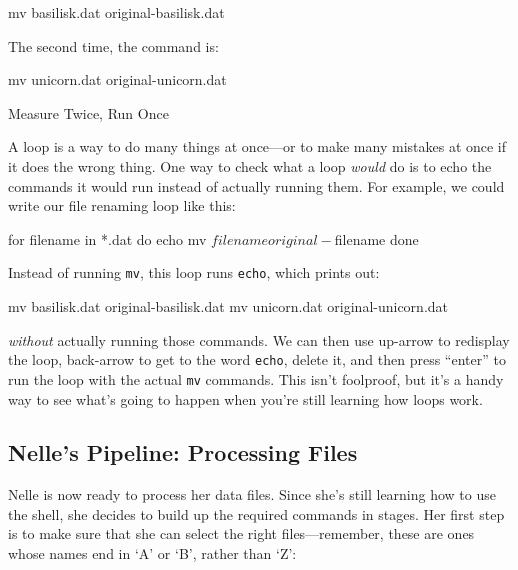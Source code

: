 \begin{VerbIn}
mv basilisk.dat original-basilisk.dat
\end{VerbIn}

The second time, the command is:

\begin{VerbIn}
mv unicorn.dat original-unicorn.dat
\end{VerbIn}

\begin{swcbox}{Measure Twice, Run Once}

A loop is a way to do many things at once---or to make many mistakes at
once if it does the wrong thing. One way to check what a loop
\emph{would} do is to echo the commands it would run instead of actually
running them. For example, we could write our file renaming loop like
this:

\begin{VerbIn}
for filename in *.dat
do
    echo mv $filename original-$filename
done
\end{VerbIn}

Instead of running \texttt{mv}, this loop runs \texttt{echo}, which
prints out:

\begin{VerbIn}
mv basilisk.dat original-basilisk.dat
mv unicorn.dat original-unicorn.dat
\end{VerbIn}

\emph{without} actually running those commands. We can then use up-arrow
to redisplay the loop, back-arrow to get to the word \texttt{echo},
delete it, and then press ``enter'' to run the loop with the actual
\texttt{mv} commands. This isn't foolproof, but it's a handy way to see
what's going to happen when you're still learning how loops work.

\end{swcbox}

\subsection*{Nelle's Pipeline: Processing Files}

Nelle is now ready to process her data files. Since she's still learning
how to use the shell, she decides to build up the required commands in
stages. Her first step is to make sure that she can select the right
files---remember, these are ones whose names end in `A' or `B', rather
than `Z':


